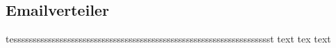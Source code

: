 \subsection{Emailverteiler}

tessssssssssssssssssssssssssssssssssssssssssssssssssssssssssssssssssst
text tex text